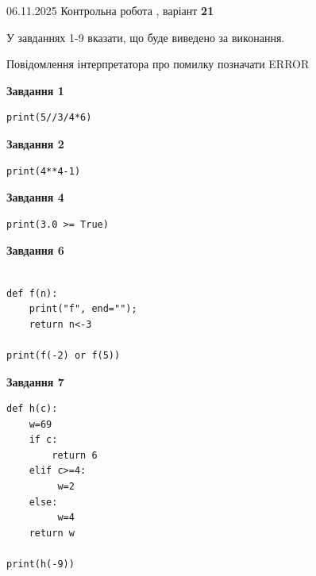\documentclass[12pt, ukrainian]{article}
\begin{document}
{\Large{06.11.2025 Контрольна робота , варіант  \No \textbf { 21 }\par}}
{
\begin {large}
У завданнях 1-9 вказати, що буде виведено за виконання.

Повідомлення інтерпретатора про помилку позначати ERROR

\begin{minipage}[t]{7.5cm}

\begin{center}
\textbf{Завдання 1}
\end{center}

\begin{verbatim}
print(5//3/4*6)
\end{verbatim}



\begin{center}
\textbf{Завдання 2}
\end{center}

\begin{verbatim}
print(4**4-1)
\end{verbatim}



\begin{center}
\textbf{Завдання 4}
\end{center}

\begin{verbatim}
print(3.0 >= True)
\end{verbatim}



\begin{center}
\textbf{Завдання 6}
\end{center}

\begin{verbatim}

def f(n):
    print("f", end="");
    return n<-3

print(f(-2) or f(5))
\end{verbatim}



\begin{center}
\textbf{Завдання 7}
\end{center}

\begin{verbatim}
def h(c):
    w=69
    if c: 
        return 6
    elif c>=4:
         w=2
    else:
         w=4
    return w

print(h(-9))
\end{verbatim}


\end{minipage}
\end{large}}
\end{document}
